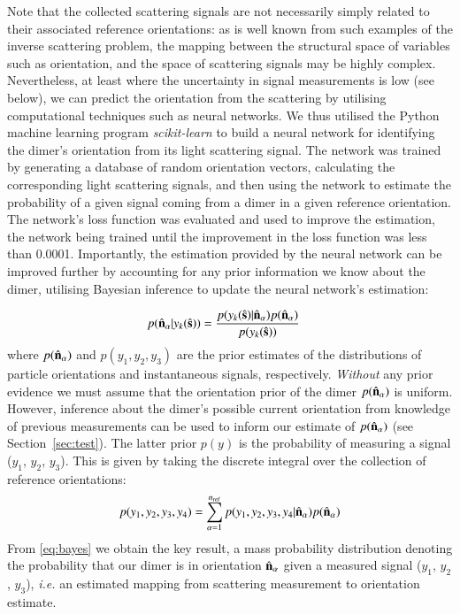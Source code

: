 \documentclass[final,  3p]{elsarticle}
\begin{document}
Note that the collected scattering signals are not necessarily simply related to their associated reference orientations: as is well known from such examples of the inverse scattering problem, the mapping between the structural space of variables such as orientation, and the space of scattering signals may be highly complex. Nevertheless, at least where the uncertainty in signal measurements is low (see below), we can predict the orientation from the scattering by utilising computational techniques such as neural networks. We thus utilised the Python machine learning program \textit{scikit-learn} to build a neural network for identifying the dimer's orientation from its light scattering signal. The network was trained by generating a database of random orientation vectors, calculating the corresponding light scattering signals, and then using the network to estimate the probability of a given signal coming from a dimer in a given reference orientation. The network's loss function was evaluated and used to improve the estimation, the network being trained until the improvement in the loss function was less than 0.0001. 
%
Importantly, the estimation provided by the neural network can be improved further by accounting for any prior information we know about the dimer,  utilising Bayesian inference to update the neural network's estimation: 

\begin{align}
  \label{eq:bayes}
  p(\hat{\bf n}_\alpha| y_k(\hat{\bf s}))
  &=
    \frac{p(y_k(\hat{\bf s})|\hat{\bf n}_\alpha)
    p(\hat{\bf n}_\alpha)}{p(y_k(\hat{\bf s}))}
\end{align}
where $p(\hat{\bf n}_\alpha)$ and $p(y_1, y_2, y_3)$ are the prior estimates of the distributions of particle orientations and instantaneous signals, respectively.
\textit{Without} any prior evidence we must assume that the orientation prior of the dimer
$p(\hat{\bf n}_{\alpha})$ is uniform. However, inference about the dimer's possible current orientation from knowledge of previous
measurements can be used to inform our estimate of $p(\hat{\bf n}_{\alpha})$ (see Section~\ref{sec:test}).  The latter prior $p(y)$ is the probability of measuring a signal ($y_1$, $y_2$, $y_3$).  This is given by taking the discrete integral over the collection of reference orientations:
\begin{align}
  p(y_1, y_2, y_3, y_4)
  =
  \sum_{\alpha=1}^{n_{\rm ref}}
  p(y_1, y_2, y_3, y_4|\hat{\bf n}_\alpha)
  p(\hat{\bf n}_\alpha)
\end{align}
From \eqref{eq:bayes} we obtain the key result, a mass probability distribution denoting the
probability that our dimer is in orientation $\hat{\bf n}_{\alpha}$ given a measured
signal ($y_1$, $y_2$, $y_3$), \textit{i.e.} an estimated mapping from scattering measurement to orientation estimate. 
\end{document}
